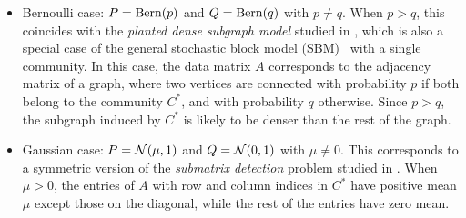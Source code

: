 \begin{itemize}
\item {Bernoulli case}: 
 $P={\rm Bern}(p)$ and $Q={\rm Bern}(q)$ with $p\neq q $. When $p>q$, this coincides with the {\em planted dense subgraph model}
studied in \cite{McSherry01,arias2013community,ChenXu14,HajekWuXu14,Montanari:15OneComm},
which is also a special case of the general stochastic block model (SBM)~\cite{Holland83} with a single community.
In this case, the data matrix $A$ corresponds to the adjacency matrix of a graph, where two vertices are connected with probability $p$ if both belong to the community $C^\ast$, and with probability $q$ otherwise.
Since $p > q$, the subgraph induced by $C^\ast$ is likely to be denser than the rest
of the graph. 

\item {Gaussian case}: $P={\mathcal{N}}(\mu,1)$ and $Q={\mathcal{N}}(0,1)$ with $\mu \neq 0$. 
This corresponds to a symmetric version of the {\em submatrix detection} problem studied in \cite{shabalin2009submatrix,kolar2011submatrix,butucea2013,Butucea2013sharp,ma2013submatrix,ChenXu14,CLR15}.
When $\mu>0$, the entries of $A$ with row and column indices in $C^\ast$ have positive mean $\mu$ except those on the diagonal, while the rest of the entries have zero mean. 
\end{itemize}



